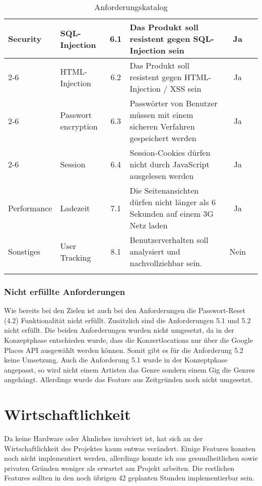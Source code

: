 \begin{longtable}[]{@{}p{1.9cm}p{2.5cm}cp{5.5cm}cc@{}}
  \midrule
  \multirow{9}{*}{Security}  & SQL-Injection              & 6.1          & Das Produkt soll resistent gegen SQL-Injection sein                                                         & Ja                              \\ \cline{2-6}
                             & HTML-Injection             & 6.2          & Das Produkt soll resistent gegen HTML-Injection / XSS sein                                                  & Ja                              \\ \cline{2-6}
                             & Passwort encryption        & 6.3          & Passwörter von Benutzer müssen mit einem sicheren Verfahren gespeichert werden                              & Ja                              \\ \cline{2-6}
                             & Session                    & 6.4          & Session-Cookies dürfen nicht durch JavaScript ausgelesen werden                                             & Ja                              \\
  \midrule
  Performance                & Ladezeit                   & 7.1          & Die Seitenansichten dürfen nicht länger als 6 Sekunden auf einem 3G Netz laden                              & Ja                              \\
  \midrule
  Sonstiges                  & User Tracking              & 8.1          & Benutzerverhalten soll analysiert und nachvollziehbar sein.                                                 & Nein                            \\
  \bottomrule
  \caption{Anforderungskatalog}
\end{longtable}

\clearpage
\subsubsection{Nicht erfüllte Anforderungen}

Wie bereits bei den Zielen ist auch bei den Anforderungen die Passwort-Reset (4.2)
Funktionalität nicht erfüllt.
Zusätzlich sind die Anforderungen 5.1 und 5.2 nicht erfüllt. Die beiden
Anforderungen wurden nicht umgesetzt, da in der Konzeptphase entschieden wurde,
dass die Konzertlocations nur über die Google Places API ausgewählt werden können.
Somit gibt es für die Anforderung 5.2 keine Umsetzung.
Auch die Anforderung 5.1 wurde in der Konzeptphase angepasst, so wird nicht einem
Artisten das Genre sondern einem Gig die Genres angehängt. Allerdings wurde das
Feature aus Zeitgründen noch nicht umgesetzt.

\section{Wirtschaftlichkeit}

Da keine Hardware oder Ähnliches involviert ist, hat sich an der
Wirtschaftlichkeit des Projektes kaum entwas verändert.
Einige Features konnten noch nicht implementiert werden, allerdings
konnte ich aus gesundheitlichen sowie privaten Gründen weniger als
erwartet am Projekt arbeiten.
Die restlichen Features sollten in den noch übrigen 42 geplanten
Stunden implementierbar sein.
